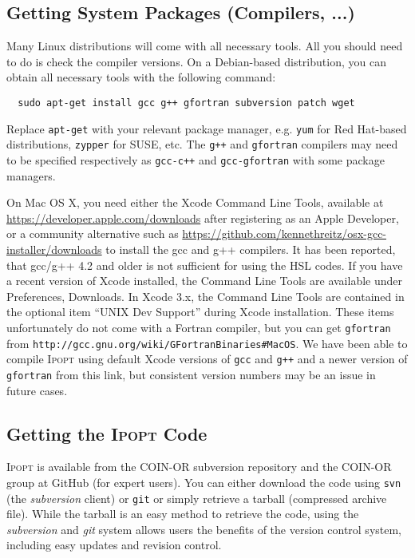 \documentclass[10pt]{article}
\newcommand{\Ipopt}{\textsc{Ipopt}\xspace}
\begin{document}
\subsection{Getting System Packages (Compilers, ...)}

Many Linux distributions will come with all necessary tools. All you should need to do is check the compiler versions. On a Debian-based distribution, you can obtain all necessary tools with the following command:
\begin{verbatim}
  sudo apt-get install gcc g++ gfortran subversion patch wget
\end{verbatim}
Replace {\tt apt-get} with your relevant package manager, e.g. {\tt yum} for Red Hat-based distributions, {\tt zypper} for SUSE, etc. The {\tt g++} and {\tt gfortran} compilers may need to be specified respectively as {\tt gcc-c++} and {\tt gcc-gfortran} with some package managers.

On Mac OS X, you need either the Xcode Command Line Tools, available at \url{https://developer.apple.com/downloads} after registering as an Apple Developer, or a community alternative such as \url{https://github.com/kennethreitz/osx-gcc-installer/downloads} to install the gcc and g++ compilers.
It has been reported, that gcc/g++ 4.2 and older is not sufficient for using the HSL codes.
If you have a recent version of Xcode installed, the Command Line Tools are available under Preferences, Downloads. In Xcode 3.x, the Command Line Tools are contained in the optional item ``UNIX Dev Support'' during Xcode installation.
These items unfortunately do not come with a Fortran compiler, but you can get {\tt gfortran} from {\tt http://gcc.gnu.org/wiki/GFortranBinaries\#MacOS}. We have been able to compile \Ipopt using default Xcode versions of {\tt gcc} and {\tt g++} and a newer version of {\tt gfortran} from this link, but consistent version numbers may be an issue in future cases.

\subsection{Getting the \Ipopt Code}
\Ipopt is available from the COIN-OR subversion repository and the COIN-OR
group at GitHub (for expert users). You can
either download the code using \texttt{svn} (the
\textit{subversion} client) or \texttt{git} or
simply retrieve a tarball (compressed archive file).  While the
tarball is an easy method to retrieve the code, using the
\textit{subversion} and \textit{git} system allows users the benefits of the version
control system, including easy updates and revision control.
\end{document}
